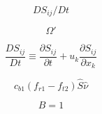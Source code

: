 \begin{equation}
DS_{ij}/Dt
\end{equation}

\begin{equation}
\Omega'
\end{equation}

\begin{equation}
\frac{D S_{ij}}{Dt} \equiv \frac{\partial S_{ij}}{\partial t} +
   u_k \frac{\partial S_{ij}}{\partial x_k}
\end{equation}

\begin{equation}
c_{b1}(f_{r1}-f_{t2})\hat S \hat \nu
\end{equation}

\begin{equation}
B=1
\end{equation}


